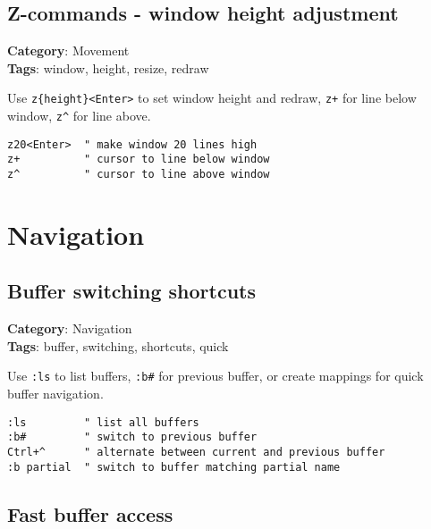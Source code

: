 {{{{{{{{\section{Z-commands - window height adjustment}

\textbf{Category}: Movement\\ \textbf{Tags}: window, height, resize, redraw
\vspace{0.5cm}

Use {\footnotesize \Verb§z{height}<Enter>§} to set window height and redraw, {\footnotesize \Verb§z+§} for line below window, {\footnotesize \Verb§z^§} for line above.

\begin{Exa*}{}
\begin{Verbatim}[fontsize=\footnotesize, breaklines, breakanywhere]
z20<Enter>  " make window 20 lines high
z+          " cursor to line below window
z^          " cursor to line above window
\end{Verbatim}
\end{Exa*}

\chapter{Navigation}
\section{Buffer switching shortcuts}

\textbf{Category}: Navigation\\ \textbf{Tags}: buffer, switching, shortcuts, quick
\vspace{0.5cm}

Use {\footnotesize \Verb§:ls§} to list buffers, {\footnotesize \Verb§:b#§} for previous buffer, or create mappings for quick buffer navigation.

\begin{Exa*}{}
\begin{Verbatim}[fontsize=\footnotesize, breaklines, breakanywhere]
:ls         " list all buffers
:b#         " switch to previous buffer
Ctrl+^      " alternate between current and previous buffer
:b partial  " switch to buffer matching partial name
\end{Verbatim}
\end{Exa*}

\section{Fast buffer access}

}}}}}}}}
